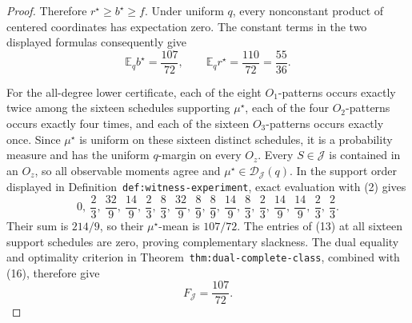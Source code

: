\documentclass{article}
\begin{document}
\begin{proof}
Therefore \(r^\star\ge b^\star\ge f\).  Under uniform \(q\), every nonconstant product of centered coordinates has expectation zero.  The constant terms in the two displayed formulas consequently give
\[
\mathbb E_q b^\star=\frac{107}{72},
\qquad
\mathbb E_q r^\star=\frac{110}{72}=\frac{55}{36}.
\tag{16}
\]

For the all-degree lower certificate, each of the eight \(O_1\)-patterns occurs exactly twice among the sixteen schedules supporting \(\mu^\star\), each of the four \(O_2\)-patterns occurs exactly four times, and each of the sixteen \(O_3\)-patterns occurs exactly once.  Since \(\mu^\star\) is uniform on these sixteen distinct schedules, it is a probability measure and has the uniform \(q\)-margin on every \(O_z\).  Every \(S\in\mathcal J\) is contained in an \(O_z\), so all observable moments agree and \(\mu^\star\in\mathcal D_{\mathcal J}(q)\).  In the support order displayed in Definition~\texttt{def:witness-experiment}, exact evaluation with (2) gives
\[
0,\ \frac23,\ \frac{32}{9},\ \frac{14}{9},\ \frac23,\ \frac83,
\ \frac{32}{9},\ \frac89,\ \frac89,\ \frac{14}{9},\ \frac83,\ \frac23,
\ \frac{14}{9},\ \frac{14}{9},\ \frac23,\ \frac23.
\tag{17}
\]
Their sum is \(214/9\), so their \(\mu^\star\)-mean is \(107/72\).  The entries of (13) at all sixteen support schedules are zero, proving complementary slackness.  The dual equality and optimality criterion in Theorem~\texttt{thm:dual-complete-class}, combined with (16), therefore give
\[
F_{\mathcal J}=\frac{107}{72}.
\tag{18}
\]


\end{proof}
\end{document}
